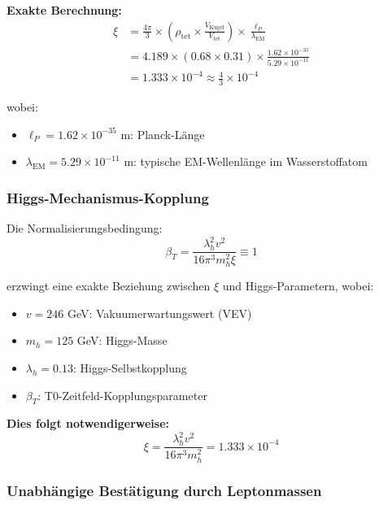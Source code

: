 \documentclass[12pt,a4paper]{article}
\numberwithin{equation}{section}
\newcommand{\xipar}{\xi}
\newcommand{\lP}{\ell_P}
\newcommand{\lambdaEM}{\lambda_{\text{EM}}}
\begin{document}
	\textbf{Exakte Berechnung:}
	\begin{align}
		\xipar &= \frac{4\pi}{3} \times \left(\rho_{\text{tet}} \times \frac{V_{\text{Kugel}}}{V_{\text{tet}}}\right) \times \frac{\lP}{\lambdaEM}\\
		&= 4.189 \times (0.68 \times 0.31) \times \frac{1.62 \times 10^{-35}}{5.29 \times 10^{-11}}\\
		&= 1.333 \times 10^{-4} \approx \frac{4}{3} \times 10^{-4}
		\label{eq:xi_geometric}
	\end{align}
	
	wobei:
	\begin{itemize}
		\item $\lP = 1.62 \times 10^{-35}$ m: Planck-Länge
		\item $\lambdaEM = 5.29 \times 10^{-11}$ m: typische EM-Wellenlänge im Wasserstoffatom
	\end{itemize}
	
	\subsubsection{Higgs-Mechanismus-Kopplung}
	
	Die Normalisierungsbedingung:
	\begin{equation}
		\beta_T = \frac{\lambda_h^2 v^2}{16\pi^3 m_h^2 \xipar} \equiv 1
		\label{eq:beta_normierung}
	\end{equation}
	
	erzwingt eine exakte Beziehung zwischen $\xipar$ und Higgs-Parametern, wobei:
	\begin{itemize}
		\item $v = 246$ GeV: Vakuumerwartungswert (VEV)
		\item $m_h = 125$ GeV: Higgs-Masse
		\item $\lambda_h = 0.13$: Higgs-Selbstkopplung
		\item $\beta_T$: T0-Zeitfeld-Kopplungsparameter
	\end{itemize}
	
	\textbf{Dies folgt notwendigerweise:}
	\begin{equation}
		\xipar = \frac{\lambda_h^2 v^2}{16\pi^3 m_h^2} = 1.333 \times 10^{-4}
		\label{eq:xi_higgs}
	\end{equation}
	
	\subsubsection{Unabhängige Bestätigung durch Leptonmassen}
	
\end{document}
